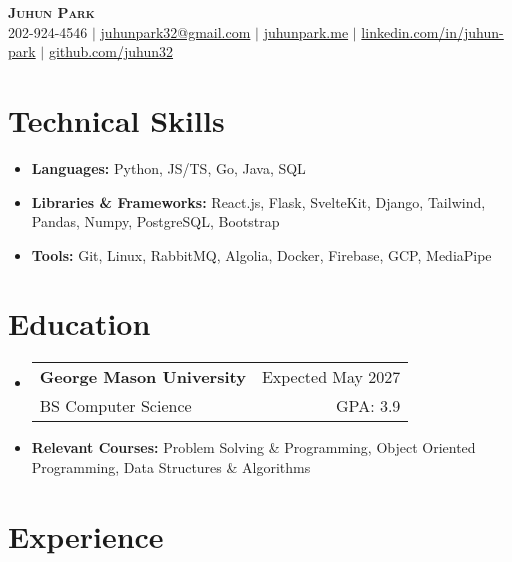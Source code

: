\documentclass[letterpaper,11pt]{article}
\makeatletter
\newcommand{\resumeItem}[1]{
  \item{
    {#1}
  }
}
\newcommand{\resumeItemThin}[1]{
  \item{
    {#1 \vspace{-5pt}}
  }
}
\newcommand{\resumeSubheading}[4]{
    \item
    \begin{tabular*}{0.985\textwidth}[t]{l@{\extracolsep{\fill}}r@{\hspace{-0.1in}}}
        {\textbf{#1}} & {#2} \\
        #3 &  #4 \\
    \end{tabular*}\vspace{-5pt}
}
\newcommand{\resumeSubHeadingListStart}{\begin{itemize}[leftmargin=0.00in, rightmargin=-0.2in, label={}]\vspace{3pt}}
\newcommand{\resumeSubHeadingListEnd}{\end{itemize}\vspace{-5pt}}
\newcommand{\resumeItemListStart}{\vspace{3pt}\begin{itemize}[leftmargin=0.15in, rightmargin=0.15in]}
\newcommand{\resumeItemListEnd}{\end{itemize}\vspace{-5pt}}
\makeatother
\begin{document}

\begin{center}
  \textbf{\Huge \scshape {Juhun Park}} \\ \vspace{3pt}
   202-924-4546 $|$
  \href{mailto:juhunpark32@gmail.com}{juhunpark32@gmail.com} $|$
  \href{https://www.juhunpark.me/}{juhunpark.me} $|$
  \href{https://linkedin.com/in/juhun-park}{linkedin.com/in/juhun-park} $|$
  \href{https://github.com/juhun32}{github.com/juhun32} \\
\end{center}

\vspace{-10pt}


\section{Technical Skills}
\resumeItemListStart
\resumeItemThin{\textbf{Languages: }{Python, JS/TS, Go, Java, SQL}}\\
\resumeItemThin{\textbf{Libraries \& Frameworks: }{React.js, Flask, SvelteKit, Django, Tailwind, Pandas, Numpy, PostgreSQL, Bootstrap}}\\
\resumeItemThin{\textbf{Tools: }{Git, Linux, RabbitMQ, Algolia, Docker, Firebase, GCP, MediaPipe}}\\

\resumeItemListEnd


\section{Education}
\resumeSubHeadingListStart
\resumeSubheading
{George Mason University}{Expected May 2027}
{BS Computer Science}{GPA: 3.9}
\resumeItem{\textbf{Relevant Courses: }{Problem Solving \& Programming, Object Oriented Programming, Data Structures \& Algorithms}}
\vspace{-5pt}
\resumeSubHeadingListEnd


\section{Experience}
\end{document}
